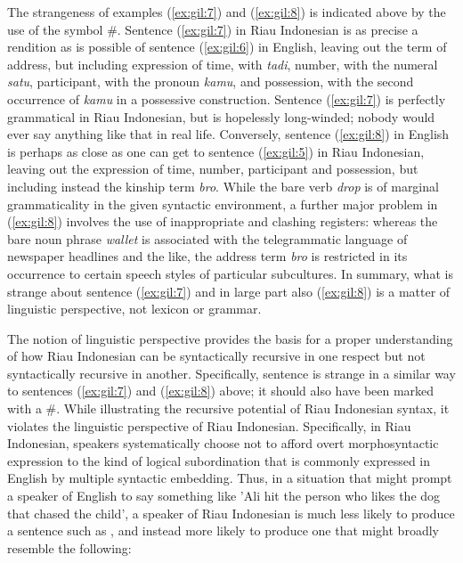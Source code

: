 \documentclass[output=paper,colorlinks,citecolor=brown
]{langscibook}
\begin{document}
The strangeness of examples (\ref{ex:gil:7}) and (\ref{ex:gil:8}) is indicated above by the use of the symbol \#.  Sentence (\ref{ex:gil:7}) in Riau Indonesian is as precise a rendition as is possible of sentence (\ref{ex:gil:6}) in English, leaving out the term of address, but including expression of time, with \emph{tadi}, number, with the numeral \emph{satu}, participant, with the pronoun \emph{kamu}, and possession, with the second occurrence of \emph{kamu} in a possessive construction.  Sentence (\ref{ex:gil:7}) is perfectly grammatical in Riau Indonesian, but is hopelessly long-winded; nobody would ever say anything like that in real life.  Conversely, sentence (\ref{ex:gil:8}) in English is perhaps as close as one can get to sentence (\ref{ex:gil:5}) in Riau Indonesian, leaving out the expression of time, number, participant and possession, but including instead the kinship term \emph{bro}.  While the bare verb \emph{drop} is of marginal grammaticality in the given syntactic environment, a further major problem in (\ref{ex:gil:8}) involves the use of inappropriate and clashing registers: whereas the bare noun phrase \emph{wallet} is associated with the telegrammatic language of newspaper headlines and the like, the address term \emph{bro} is restricted in its occurrence to certain speech styles of particular subcultures.  In summary, what is strange about sentence (\ref{ex:gil:7}) and in large part also (\ref{ex:gil:8}) is a matter of linguistic perspective, not lexicon or grammar.

The notion of linguistic perspective provides the basis for a proper understanding of how Riau Indonesian can be syntactically recursive in one respect but not syntactically recursive in another.  Specifically, sentence  is strange in a similar way to sentences (\ref{ex:gil:7}) and (\ref{ex:gil:8}) above; it should also have been marked with a \#.  While illustrating the recursive potential of Riau Indonesian syntax, it violates the linguistic perspective of Riau Indonesian.  Specifically, in Riau Indonesian, speakers systematically choose not to afford overt morphosyntactic expression to the kind of logical subordination that is commonly expressed in English by multiple syntactic embedding.  Thus, in a situation that might prompt a speaker of English to say something like 'Ali hit the person who likes the dog that chased the child', a speaker of Riau Indonesian is much less likely to produce a sentence such as , and instead more likely to produce one that might broadly resemble the following:
\end{document}
